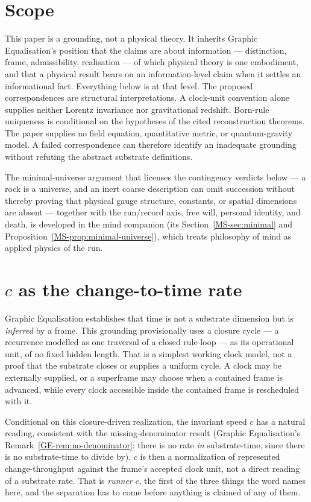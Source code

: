 \documentclass[11pt,a4paper]{article}
\theoremstyle{remark}\newtheorem{remark}[definition]{Remark}
\begin{document}
\section{Scope}\label{sec:scope}
This paper is a grounding, not a physical theory. It inherits Graphic
Equalisation's position that the claims are about information --- distinction,
frame, admissibility, realisation --- of which physical theory is one embodiment,
and that a physical result bears on an information-level claim when it settles an
informational fact. Everything below is at that level. The proposed correspondences are structural interpretations. A clock-unit convention
alone supplies neither Lorentz invariance nor gravitational redshift. Born-rule
uniqueness is conditional on the hypotheses of the cited reconstruction theorems.
The paper supplies no field equation, quantitative metric, or quantum-gravity model.
A failed correspondence can therefore identify an inadequate grounding without
refuting the abstract substrate definitions.

The minimal-universe argument that licenses the contingency verdicts below --- a
rock is a universe, and an inert coarse description can omit succession without thereby proving that physical gauge structure, constants, or spatial dimensions are absent --- together with the
run/record axis, free will, personal identity, and death, is developed in the
mind companion (its Section~\ref{MS-sec:minimal} and
Proposition~\ref{MS-prop:minimal-universe}), which treats philosophy of mind as
applied physics of the run.

\section{\texorpdfstring{$c$}{c} as the change-to-time rate}\label{sec:c-rate}
Graphic Equalisation establishes that time is not a substrate dimension but is
\emph{inferred} by a frame. This grounding provisionally uses a closure cycle --- a recurrence
modelled as one traversal of a closed rule-loop --- as its operational unit, of no fixed hidden
length. That is a simplest working clock model, not a proof that the substrate closes or supplies a
uniform cycle. A clock may be externally supplied, or a superframe may choose when a contained frame
is advanced, while every clock accessible inside the contained frame is rescheduled with it.

Conditional on this closure-driven realization, the invariant speed $c$ has a natural reading,
consistent with the missing-denominator result (Graphic Equalisation's Remark~\ref{GE-rem:no-denominator}: there is no
rate \emph{in} substrate-time, since there is no substrate-time to divide by). $c$ is then a
normalization of represented change-throughput against the frame's accepted clock unit, not a direct
reading of a substrate rate. That is \emph{runner} $c$, the first of the three things the word names
here, and the separation has to come before anything is claimed of any of them.
\end{document}
